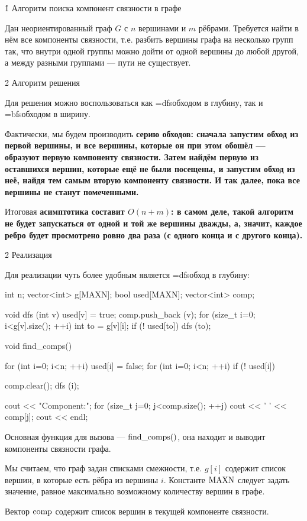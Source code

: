 \h1{ Алгоритм поиска компонент связности в графе }

Дан неориентированный граф $G$ с $n$ вершинами и $m$ рёбрами. Требуется найти в нём все компоненты связности, т.е. разбить вершины графа на несколько групп так, что внутри одной группы можно дойти от одной вершины до любой другой, а между разными группами --- пути не существует.


\h2{ Алгоритм решения }

Для решения можно воспользоваться как \algohref=dfs{обходом в глубину}, так и \algohref=bfs{обходом в ширину}.

Фактически, мы будем производить \bf{серию обходов}: сначала запустим обход из первой вершины, и все вершины, которые он при этом обошёл --- образуют первую компоненту связности. Затем найдём первую из оставшихся вершин, которые ещё не были посещены, и запустим обход из неё, найдя тем самым вторую компоненту связности. И так далее, пока все вершины не станут помеченными.

Итоговая \bf{асимптотика} составит $O(n + m)$: в самом деле, такой алгоритм не будет запускаться от одной и той же вершины дважды, а, значит, каждое ребро будет просмотрено ровно два раза (с одного конца и с другого конца).


\h2{ Реализация }

Для реализации чуть более удобным является \algohref=dfs{обход в глубину}:

\code
int n;
vector<int> g[MAXN];
bool used[MAXN];
vector<int> comp;

void dfs (int v) {
	used[v] = true;
	comp.push_back (v);
	for (size_t i=0; i<g[v].size(); ++i) {
		int to = g[v][i];
		if (! used[to])
			dfs (to);
	}
}

void find_comps() {
	for (int i=0; i<n; ++i)
		used[i] = false;
	for (int i=0; i<n; ++i)
		if (! used[i]) {
			comp.clear();
			dfs (i);

			cout << "Component:";
			for (size_t j=0; j<comp.size(); ++j)
				cout << ' ' << comp[j];
			cout << endl;
		}
}
\endcode

Основная функция для вызова --- $\rm find\_comps()$, она находит и выводит компоненты связности графа.

Мы считаем, что граф задан списками смежности, т.е. $g[i]$ содержит список вершин, в которые есть рёбра из вершины $i$. Константе $\rm MAXN$ следует задать значение, равное максимально возможному количеству вершин в графе.

Вектор $\rm comp$ содержит список вершин в текущей компоненте связности.